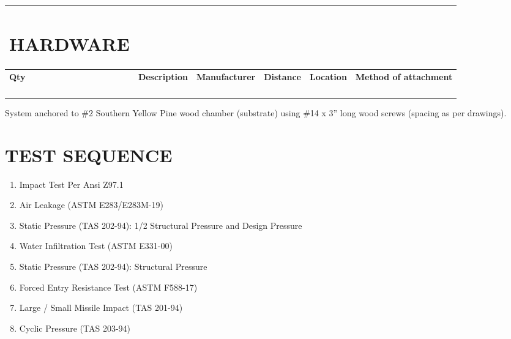 \begin{longtable}[]{@{}llllll@{}}
\toprule
\begin{minipage}[b]{0.14\columnwidth}\raggedright
\hypertarget{hardware}{%
\section{\texorpdfstring{\textbf{HARDWARE}}{HARDWARE}}\label{hardware}}\strut
\end{minipage} & \begin{minipage}[b]{0.14\columnwidth}\raggedright
\strut
\end{minipage} & \begin{minipage}[b]{0.14\columnwidth}\raggedright
\strut
\end{minipage} & \begin{minipage}[b]{0.14\columnwidth}\raggedright
\strut
\end{minipage} & \begin{minipage}[b]{0.14\columnwidth}\raggedright
\strut
\end{minipage} & \begin{minipage}[b]{0.14\columnwidth}\raggedright
\strut
\end{minipage}\tabularnewline
\midrule
\endhead
\textbf{Qty} & \textbf{Description} & \textbf{Manufacturer} &
\textbf{Distance} & \textbf{Location} & \textbf{Method of
attachment}\tabularnewline
& & & & &\tabularnewline
& & & & &\tabularnewline
& & & & &\tabularnewline
& & & & &\tabularnewline
\bottomrule
\end{longtable}

System anchored to \#2 Southern Yellow Pine wood chamber (substrate)
using \#14 x 3'' long wood screws (spacing as per drawings).

\hypertarget{test-sequence}{%
\section{\texorpdfstring{\textbf{TEST
SEQUENCE}}{TEST SEQUENCE}}\label{test-sequence}}

\begin{enumerate}
\def\labelenumi{\arabic{enumi}.}
\item
  Impact Test Per Ansi Z97.1
\item
  Air Leakage (ASTM E283/E283M-19)
\item
  Static Pressure (TAS 202-94): 1/2 Structural Pressure and Design
  Pressure
\item
  Water Infiltration Test (ASTM E331-00)
\item
  Static Pressure (TAS 202-94): Structural Pressure
\item
  Forced Entry Resistance Test (ASTM F588-17)
\item
  Large / Small Missile Impact (TAS 201-94)
\item
  Cyclic Pressure (TAS 203-94)
\end{enumerate}

